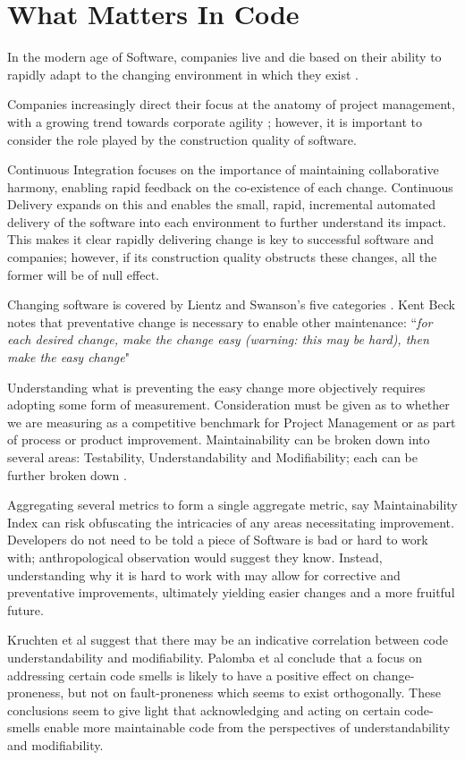 \section{What Matters In Code}

In the modern age of Software, companies live and die based on their ability to rapidly adapt to the changing environment in which they exist \parencite[Chapter~1]{kersten_2018}.

Companies increasingly direct their focus at the anatomy of project management, with a growing trend towards corporate agility \parencite{stateOfAgile_2019}; however, it is important to consider the role played by the construction quality of software.

Continuous Integration \parencite{duvall2007continuous} focuses on the importance of maintaining collaborative harmony, enabling rapid feedback on the co-existence of each change. Continuous Delivery \parencite{humble_farley_2010} expands on this and enables the small, rapid, incremental automated delivery of the software into each environment to further understand its impact. This makes it clear rapidly delivering change is key to successful software and companies; however, if its construction quality obstructs these changes, all the former will be of null effect.

Changing software is covered by Lientz and Swanson's five categories \parencite*{lientz1980software}. Kent Beck notes that preventative change is necessary to enable other maintenance: ``\textit{for each desired change, make the change easy (warning: this may be hard), then make the easy change}" \parencite{beck_2012_easychange}

Understanding what is preventing the easy change more objectively requires adopting some form of measurement. Consideration must be given as to whether we are measuring as a competitive benchmark for Project Management or as part of process or product improvement. Maintainability can be broken down into several areas: Testability, Understandability and Modifiability; each can be further broken down \parencite{Boehm:1976:QES:800253.807736}.

Aggregating several metrics to form a single aggregate metric, say Maintainability Index \parencite{bray1997c4} can risk obfuscating the intricacies of any areas necessitating improvement. Developers do not need to be told a piece of Software is bad or hard to work with; anthropological observation would suggest they know. Instead, understanding why it is hard to work with may allow for corrective and preventative improvements, ultimately yielding easier changes and a more fruitful future.

Kruchten et al \parencite*{kruchten2012technical} suggest that there may be an indicative correlation between code understandability and modifiability. Palomba et al \parencite*{palomba2018diffuseness} conclude that a focus on addressing certain code smells \parencite[chapter~3]{fowler1999refactoring} is likely to have a positive effect on change-proneness, but not on fault-proneness which seems to exist orthogonally. These conclusions seem to give light that acknowledging and acting on certain code-smells enable more maintainable code from the perspectives of understandability and modifiability. 